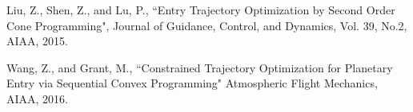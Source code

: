 \documentclass[10pt,a4paper]{article}
\begin{document}
	
	\begin{thebibliography}{1}
	Liu, Z., Shen, Z., and Lu, P., ``Entry Trajectory Optimization by Second Order Cone Programming", Journal of Guidance, Control, and Dynamics, Vol. 39, No.2,  AIAA, 2015.
	
	Wang, Z., and Grant, M., ``Constrained Trajectory Optimization for Planetary Entry via Sequential Convex Programming" Atmospheric Flight Mechanics, AIAA, 2016. 
	\end{thebibliography}
\end{document}
